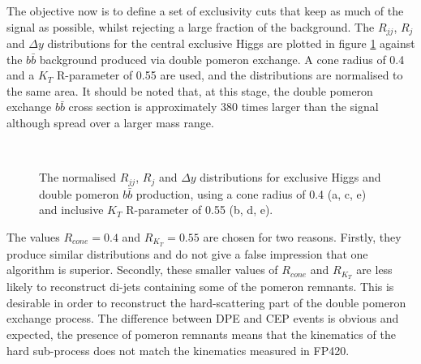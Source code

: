 The objective now is to define a set of exclusivity cuts that keep as much of the signal as possible, whilst rejecting a large fraction of the background. The $R_{jj}$, $R_j$ and $\Delta y$ distributions for the central exclusive Higgs are plotted in figure \ref{fig:higgsvsdpebb} against the $b\bar{b}$ background produced via double pomeron exchange. A cone radius of 0.4 and a $K_T$ R-parameter of 0.55 are used, and the distributions are normalised to the same area. It should be noted that, at this stage, the double pomeron exchange $b\bar{b}$ cross section is approximately 380 times larger than the signal although spread over a larger mass range. 

\begin{figure} 
\centering
\mbox{
	\quad
	}
\mbox{
	\quad
	}
\mbox{
	\quad
}
\caption[Comparison of the $R_{jj}$, $R_j$ and $\Delta y$ distributions for exclusive Higgs and double pomeron $b\bar{b}$ events ]{The normalised $R_{jj}$, $R_j$ and $\Delta y$ distributions for exclusive Higgs and double pomeron $b\bar{b}$ production, using a cone radius of 0.4 (a, c, e) and inclusive $K_T$ R-parameter of 0.55 (b, d, e).\label{fig:higgsvsdpebb}}
\end{figure}

The values $R_{cone}=0.4$ and $R_{K_T} = 0.55$ are chosen for two reasons. Firstly, they produce similar distributions and do not give a false impression that one algorithm is superior. Secondly, these smaller values of $R_{cone}$ and $R_{K_T}$ are less likely to reconstruct di-jets containing some of the pomeron remnants. This is desirable in order to reconstruct the hard-scattering part of the double pomeron exchange process. The difference between DPE and CEP events is obvious and expected, the presence of pomeron remnants means that the kinematics of the hard sub-process does not match the kinematics measured in FP420.


